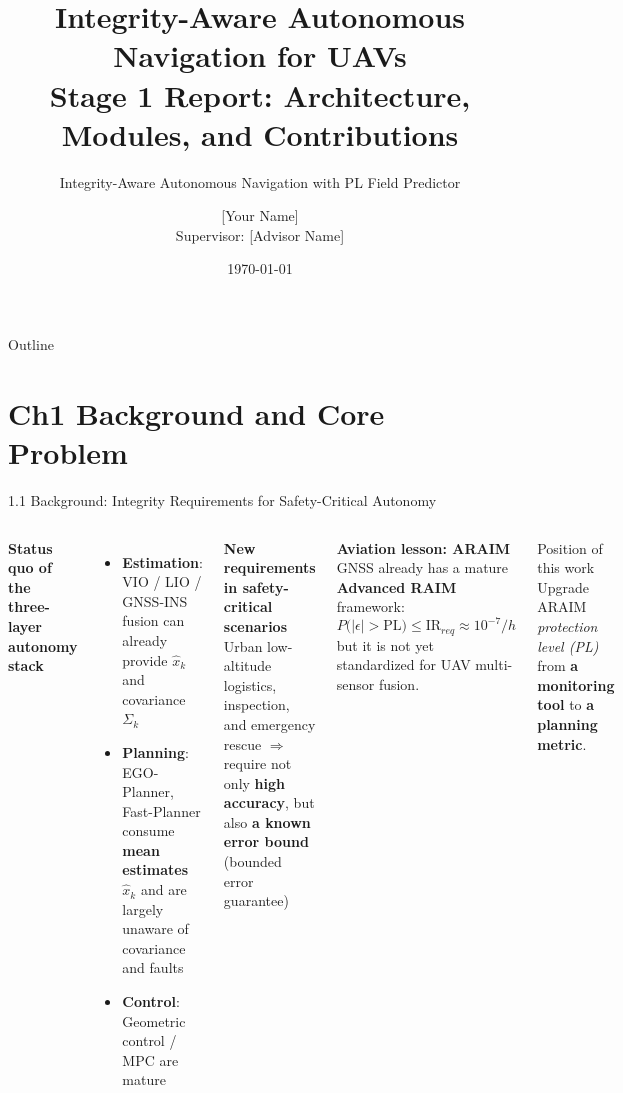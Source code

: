 \documentclass[10pt,aspectratio=169,xcolor=dvipsnames]{beamer}
\title{\texorpdfstring{Integrity-Aware Autonomous Navigation for UAVs\\
\large Stage 1 Report: Architecture, Modules, and Contributions}{Integrity-Aware Autonomous Navigation for UAVs - Stage 1 Report}}
\subtitle{Integrity-Aware Autonomous Navigation with PL Field Predictor}
\author{\texorpdfstring{[Your Name]\\\small Supervisor: [Advisor Name]}{[Your Name] / Supervisor: [Advisor Name]}}
\institute{\small [Laboratory / Department]}
\date{\today}
\newcommand{\PL}{\mathrm{PL}}
\newcommand{\IR}{\mathrm{IR}}
\newcommand{\1}{\mathbb{1}}
\newcommand{\innov}[1]{\textcolor{NavyBlue}{\textbf{#1}}}
\begin{document}
\maketitle

\begin{frame}{Outline}
  \tableofcontents
\end{frame}

\section{Ch1 Background and Core Problem}

\begin{frame}{1.1 Background: Integrity Requirements for Safety-Critical Autonomy}
  \begin{columns}[T]
    \textbf{Status quo of the three-layer autonomy stack}
    \begin{itemize}\small
      \item \textbf{Estimation}: VIO / LIO / GNSS-INS fusion can already provide
        \(\hat{x}_k\) and covariance \(\Sigma_k\)
      \item \textbf{Planning}: EGO-Planner, Fast-Planner consume \textbf{mean estimates}
        \(\hat{x}_k\) and are largely unaware of covariance and faults
      \item \textbf{Control}: Geometric control / MPC are mature
    \end{itemize}
    \vspace{3pt}
    \textbf{New requirements in safety-critical scenarios}\\
    Urban low-altitude logistics, inspection, and emergency rescue
    $\Rightarrow$ require not only \textbf{high accuracy},
    but also \textbf{a known error bound} (bounded error guarantee)

    \textbf{Aviation lesson: ARAIM}\\
    GNSS already has a mature \innov{Advanced RAIM} framework:
    \[
      P\bigl(|\epsilon| > \PL\bigr) \le \IR_{req} \approx 10^{-7}/h
    \]
    but it is not yet standardized for UAV multi-sensor fusion.

    \vspace{6pt}
    \begin{block}{\small Position of this work}
      \small Upgrade ARAIM \emph{protection level (PL)} from
      \textbf{a monitoring tool} to
      \textbf{a planning metric}.
    \end{block}
  \end{columns}
\end{frame}
\end{document}
